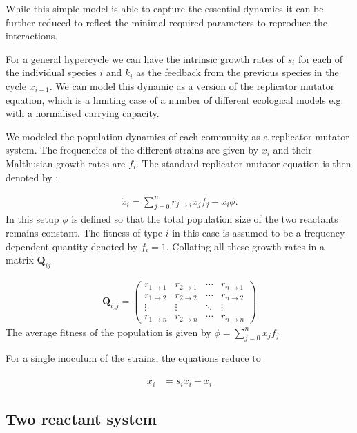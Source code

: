 While this simple model is able to capture the essential dynamics it can be further reduced to reflect the minimal required parameters to reproduce the interactions.

For a general hypercycle we can have the intrinsic growth rates of $s_i$ for each of the individual species $i$ and $k_i$ as the feedback from the previous species in the cycle $x_{i-1}$.
We can model this dynamic as a version of the replicator mutator equation, which is a limiting case of a number of different ecological models e.g. with a normalised carrying capacity.

We modeled the population dynamics of each community as a replicator-mutator system.
The frequencies of the different strains are given by $x_i$ and their Malthusian growth rates are $f_i$.
The standard replicator-mutator equation is then denoted by \citep{nowak:TREE:1992,nowak:book:2006}:

\begin{align}
	\dot{x}_i = \sum_{j=0}^{n} r_{j \rightarrow i} x_j f_j - x_i \phi.
\end{align}
In this setup $\phi$ is defined so that the total population size of the two reactants remains constant.
The fitness of type $i$ in this case is assumed to be a frequency dependent quantity denoted by $f_i = 1$. Collating all these growth rates in a matrix $\mathbf{Q}_{ij}$

\begin{align}
	\mathbf{Q}_{i,j} =
 \begin{pmatrix}
  r_{1 \rightarrow 1} & r_{2 \rightarrow 1} & \cdots & r_{n \rightarrow 1} \\
  r_{1 \rightarrow 2} & r_{2 \rightarrow 2} & \cdots & r_{n \rightarrow 2} \\
  \vdots  & \vdots  & \ddots & \vdots  \\
  r_{1 \rightarrow n} & r_{2 \rightarrow n} & \cdots & r_{n \rightarrow n} 
 \end{pmatrix}
\end{align}
The average fitness of the population is given by $\phi = \sum_{j=0}^{n} x_j f_j$

For a single inoculum of the strains, the equations reduce to

\begin{align}
	\dot{x}_i &=  s_i x_i - x_i
\end{align}

\subsection{Two reactant system}

